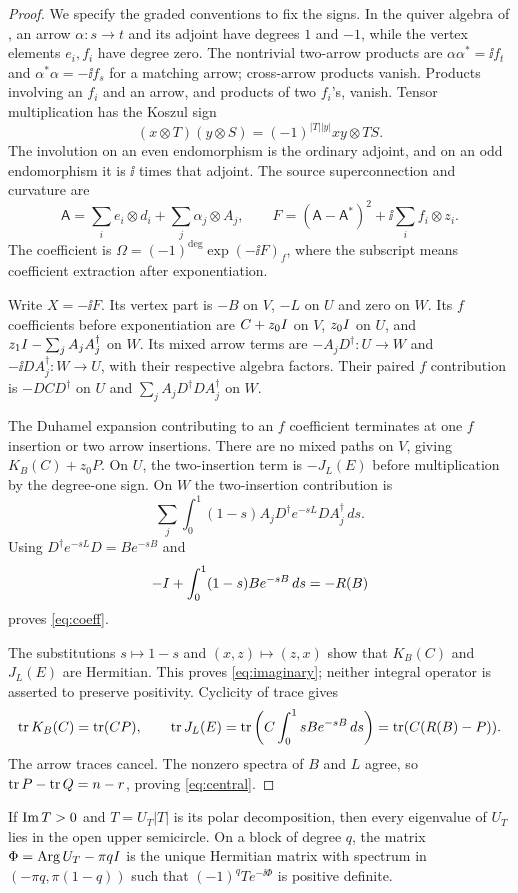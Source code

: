 \begin{proof}
We specify the graded conventions to fix the signs. In the quiver
algebra of \cite[Definition~5.13]{hkkp26}, an arrow $\alpha:s\to t$
and its adjoint have degrees $1$ and $-1$, while the vertex elements
$e_i,f_i$ have degree zero. The nontrivial two-arrow products are
$\alpha\alpha^*=\ii f_t$ and
$\alpha^*\alpha=-\ii f_s$ for a matching arrow; cross-arrow products
vanish. Products involving an $f_i$ and an arrow, and products of two
$f_i$'s, vanish. Tensor multiplication has the Koszul sign
\[
 (x\otimes T)(y\otimes S)=(-1)^{|T||y|}xy\otimes TS.
\]
The involution on an even endomorphism is the ordinary adjoint, and
on an odd endomorphism it is $\ii$ times that adjoint.
The source superconnection and curvature are
\[
 \mathsf A=\sum_i e_i\otimes d_i+\sum_j\alpha_j\otimes A_j,\qquad
 F=(\mathsf A-\mathsf A^*)^2+\ii\sum_i f_i\otimes z_i.
\]
The coefficient is
$\Omega=(-1)^{\deg}\exp(-\ii F)_f$, where the subscript means
coefficient extraction after exponentiation.

Write $X=-\ii F$. Its vertex part is $-B$ on $V$, $-L$ on $U$
and zero on $W$. Its $f$ coefficients before exponentiation are
$C+z_0I$ on $V$, $z_0I$ on $U$, and
$z_1I-\sum_j A_jA_j^\dagger$ on $W$.
Its mixed arrow terms are $-A_jD^\dagger:U\to W$ and
$-\ii DA_j^\dagger:W\to U$, with their respective algebra factors.
Their paired $f$ contribution is $-DCD^\dagger$ on $U$ and
$\sum_j A_jD^\dagger DA_j^\dagger$ on $W$.

The Duhamel expansion contributing to an $f$ coefficient terminates
at one $f$ insertion or two arrow insertions. There are no mixed
paths on $V$, giving $K_B(C)+z_0P$. On $U$, the two-insertion term
is $-J_L(E)$ before multiplication by the degree-one sign.
On $W$ the two-insertion contribution is
\[
 \sum_j\int_0^1(1-s)A_jD^\dagger e^{-sL}DA_j^\dagger\,ds.
\]
Using $D^\dagger e^{-sL}D=Be^{-sB}$ and
\[
 -I+\int_0^1(1-s)Be^{-sB}\,ds=-R(B)
\]
proves \eqref{eq:coeff}.

The substitutions $s\mapsto1-s$ and $(x,z)\mapsto(z,x)$ show that
$K_B(C)$ and $J_L(E)$ are Hermitian. This proves
\eqref{eq:imaginary}; neither integral operator is asserted to preserve
positivity. Cyclicity of trace gives
\[
 \operatorname{tr} K_B(C)=\operatorname{tr}(CP),\qquad
 \operatorname{tr} J_L(E)
 =\operatorname{tr}\left(C\int_0^1sBe^{-sB}\,ds\right)
 =\operatorname{tr}(C(R(B)-P)).
\]
The arrow traces cancel. The nonzero spectra of $B$ and $L$ agree,
so $\operatorname{tr} P-\operatorname{tr} Q=n-r$, proving \eqref{eq:central}.
\end{proof}

\begin{lemma}\label{lem:phase}
If $\operatorname{Im} T>0$ and $T=U_T|T|$ is its polar decomposition, then
every eigenvalue of $U_T$ lies in the open upper semicircle.
On a block of degree $q$, the matrix
$\Phi=\operatorname{Arg} U_T-\pi qI$ is the unique Hermitian matrix with spectrum
in $(-\pi q,\pi(1-q))$ such that
$(-1)^qT e^{-\ii\Phi}$ is positive definite.
\end{lemma}

